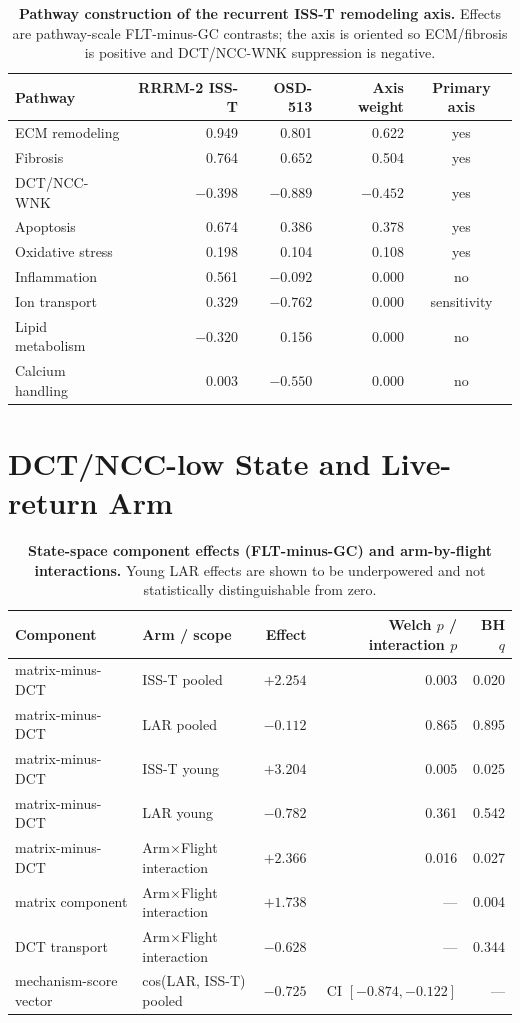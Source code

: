 \documentclass[10pt]{article}
\begin{document}
\begin{table}[H]
\centering\small
\caption{\textbf{Pathway construction of the recurrent ISS-T remodeling axis.} Effects are pathway-scale FLT-minus-GC contrasts; the axis is oriented so ECM/fibrosis is positive and DCT/NCC-WNK suppression is negative.}
\label{tab:axis}
\begin{tabular}{lrrrc}
\toprule
Pathway & RRRM-2 ISS-T & OSD-513 & Axis weight & Primary axis \\
\midrule
ECM remodeling & 0.949 & 0.801 & 0.622 & yes \\
Fibrosis & 0.764 & 0.652 & 0.504 & yes \\
DCT/NCC-WNK & $-0.398$ & $-0.889$ & $-0.452$ & yes \\
Apoptosis & 0.674 & 0.386 & 0.378 & yes \\
Oxidative stress & 0.198 & 0.104 & 0.108 & yes \\
Inflammation & 0.561 & $-0.092$ & 0.000 & no \\
Ion transport & 0.329 & $-0.762$ & 0.000 & sensitivity \\
Lipid metabolism & $-0.320$ & 0.156 & 0.000 & no \\
Calcium handling & 0.003 & $-0.550$ & 0.000 & no \\
\bottomrule
\end{tabular}
\end{table}

\section{DCT/NCC-low State and Live-return Arm}

\begin{table}[H]
\centering\small
\caption{\textbf{State-space component effects (FLT-minus-GC) and arm-by-flight interactions.} Young LAR effects are shown to be underpowered and not statistically distinguishable from zero.}
\label{tab:state}
\begin{tabular}{llrrr}
\toprule
Component & Arm / scope & Effect & Welch $p$ / interaction $p$ & BH $q$ \\
\midrule
matrix-minus-DCT & ISS-T pooled & $+2.254$ & 0.003 & 0.020 \\
matrix-minus-DCT & LAR pooled & $-0.112$ & 0.865 & 0.895 \\
matrix-minus-DCT & ISS-T young & $+3.204$ & 0.005 & 0.025 \\
matrix-minus-DCT & LAR young & $-0.782$ & 0.361 & 0.542 \\
matrix-minus-DCT & Arm$\times$Flight interaction & $+2.366$ & 0.016 & 0.027 \\
matrix component & Arm$\times$Flight interaction & $+1.738$ & --- & 0.004 \\
DCT transport & Arm$\times$Flight interaction & $-0.628$ & --- & 0.344 \\
mechanism-score vector & cos(LAR, ISS-T) pooled & $-0.725$ & CI $[-0.874,-0.122]$ & --- \\
\bottomrule
\end{tabular}
\end{table}
\end{document}
